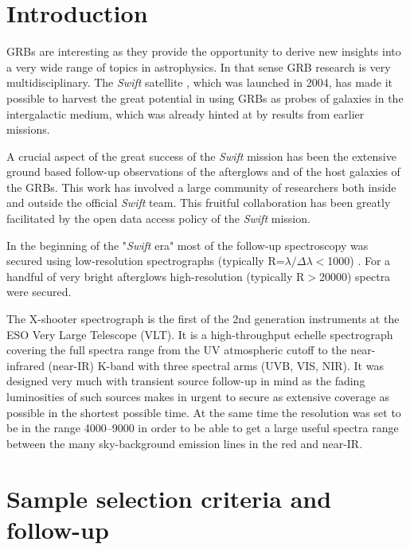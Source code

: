 \documentclass{aa}    %
\begin{document}
\section{Introduction}


GRBs are interesting as they provide the opportunity to derive new insights
into a very wide range of topics in astrophysics. In that sense GRB
research is very multidisciplinary. The {\it Swift} satellite \citep{Gehrels09}, 
which was launched in 2004, has made
it possible to harvest the great potential in using GRBs as probes of
galaxies in the intergalactic medium, which was already hinted at by
results from earlier missions.

A crucial aspect of the great success of the {\it Swift} mission has been
the extensive ground based follow-up observations of the afterglows and of
the host galaxies of the GRBs. This work has involved a large community
of researchers both inside and outside the official {\it Swift} team. This fruitful
collaboration has been greatly facilitated by the open data access policy
of the {\it Swift} mission.

In the beginning of the "{\it Swift} era" most of the follow-up spectroscopy
was secured using low-resolution spectrographs (typically
R=$\lambda/\Delta\lambda$$<$1000) \citep[e.g.][]{Fynbo2009}. For a handful of
very bright afterglows high-resolution (typically R$>$20000) spectra were
secured. 

The X-shooter spectrograph \citep{Vernet2011} is the first of the 2nd generation
instruments at the ESO Very Large Telescope (VLT). It is a high-throughput 
echelle spectrograph
covering the full spectra range from the UV atmospheric cutoff to the near-infrared
(near-IR)
K-band with three spectral arms (UVB, VIS, NIR). It was designed very much with
transient source follow-up in mind as the fading luminosities of such sources 
makes in urgent to secure as extensive coverage as possible in the shortest possible 
time. At the same time the resolution was set to be in the range 4000--9000 in order
to be able to get a large useful spectra range between the many sky-background
emission lines in the red and near-IR.


\section{Sample selection criteria and follow-up}
\end{document}
